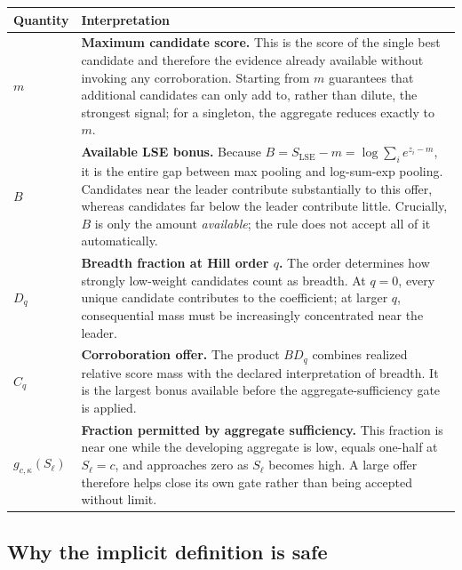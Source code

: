 \documentclass[11pt]{article}
\newcommand{\LSE}{\operatorname{LSE}}
\begin{document}
\begin{center}
\small
\begin{tabularx}{0.92\textwidth}{@{}>{\raggedright\arraybackslash}p{}>{\raggedright\arraybackslash}X@{}}
\toprule
Quantity & Interpretation \\
\midrule
$m$ & \textbf{Maximum candidate score.}  This is the score of the single
best candidate and therefore the evidence already available without invoking
any corroboration.  Starting from $m$ guarantees that additional candidates
can only add to, rather than dilute, the strongest signal; for a singleton,
the aggregate reduces exactly to $m$. \\
\addlinespace
$B$ & \textbf{Available LSE bonus.} Because
$B=S_{\LSE}-m=\log\sum_i e^{z_i-m}$, it is the entire gap between max pooling
and log-sum-exp pooling.  Candidates near the leader contribute substantially
to this offer, whereas candidates far below the leader contribute little.
Crucially, $B$ is only the amount \emph{available}; the rule does not accept
all of it automatically. \\
\addlinespace
$D_q$ & \textbf{Breadth fraction at Hill order $q$.} The order determines
how strongly low-weight candidates count as breadth. At $q=0$, every unique
candidate contributes to the coefficient; at larger $q$, consequential mass
must be increasingly concentrated near the leader. \\
\addlinespace
$C_q$ & \textbf{Corroboration offer.} The product $BD_q$ combines realized
relative score mass with the declared interpretation of breadth. It is the
largest bonus available before the aggregate-sufficiency gate is applied. \\
\addlinespace
$g_{c,\kappa}(S_\ell)$ & \textbf{Fraction permitted by aggregate sufficiency.}
This fraction is near one while the developing aggregate is low, equals
one-half at $S_\ell=c$, and approaches zero as $S_\ell$ becomes high. A large offer
therefore helps close its own gate rather than being accepted without limit. \\
\bottomrule
\end{tabularx}
\end{center}

\subsection{Why the implicit definition is safe}
\end{document}
